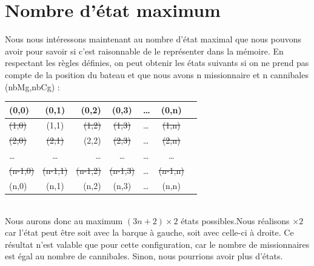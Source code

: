 \documentclass[a4paper, 12pt, french, oneside]{book}
\begin{document}
\section{Nombre d'état maximum}
Nous nous intéressons maintenant au nombre d'état maximal que nous pouvons avoir pour savoir si c'est raisonnable de le représenter dans la mémoire. En respectant les règles définies, on peut obtenir les états suivants si on ne prend pas compte de la position du bateau et que nous avons n missionnaire et n cannibales (nbMg,nbCg) : \\
\begin{tabular}{|l|c|r|c|l|c|r|}
    \hline
    (0,0)          & (0,1) & (0,2)          & (0,3) & \dots & (0,n) \\
    \hline
    \sout{(1,0)}   &
    (1,1)          &
    \sout{(1,2)}   &
    \sout{(1,3)}   & \dots &
    \sout{(1,n)}                                                    \\
    \hline
    \sout{(2,0)}   &
    \sout{(2,1)}   &
    (2,2)          &
    \sout{(2,3)}   & \dots &
    \sout{(2,n)}                                                    \\
    \hline
    \dots          & \dots & \dots          & \dots & \dots & \dots \\
    \hline
    \sout{(n-1,0)} &
    \sout{(n-1,1)} &
    \sout{(n-1,2)} &
    \sout{(n-1,3)} & \dots & \sout{(n-1,n)}                         \\
    \hline
    (n,0)          &
    (n,1)          &
    (n,2)          &
    (n,3)          & \dots & (n,n)                                  \\
    \hline
\end{tabular} \\
Nous aurons donc au maximum $(3n+2)\times2$ états possibles.Nous réalisons $\times 2$ car l'état peut être soit avec la barque à gauche, soit avec celle-ci à droite. Ce résultat n'est valable que pour cette configuration, car le nombre de missionnaires est égal au nombre de cannibales. Sinon, nous pourrions avoir plus d'états.
\end{document}
